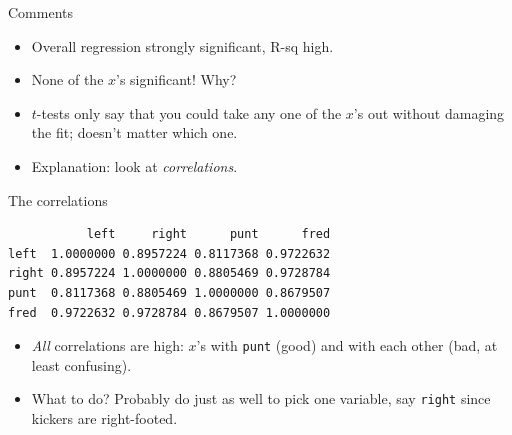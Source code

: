 \begin{frame}{Comments}

  \begin{itemize}
  \item Overall regression strongly significant, R-sq high.
  \item None of the $x$'s significant! Why?
  \item $t$-tests only say that you could take any one of the $x$'s out without damaging the fit; doesn't matter which one.
  \item Explanation: look at {\em correlations}. 
  \end{itemize}
\end{frame}

\begin{frame}[fragile]{The correlations}  

 
\begin{knitrout}
\color{fgcolor}\begin{kframe}
\begin{alltt}
\end{alltt}
\begin{verbatim}
           left     right      punt      fred
left  1.0000000 0.8957224 0.8117368 0.9722632
right 0.8957224 1.0000000 0.8805469 0.9728784
punt  0.8117368 0.8805469 1.0000000 0.8679507
fred  0.9722632 0.9728784 0.8679507 1.0000000
\end{verbatim}
\end{kframe}
\end{knitrout}
  

\begin{itemize}
\item {\em All} correlations are high: $x$'s with \verb-punt- (good) and
with each other (bad, at least confusing).
\item What to do? Probably do just as well to pick one variable, say
\texttt{right} since kickers are right-footed.
\end{itemize}



\end{frame}

